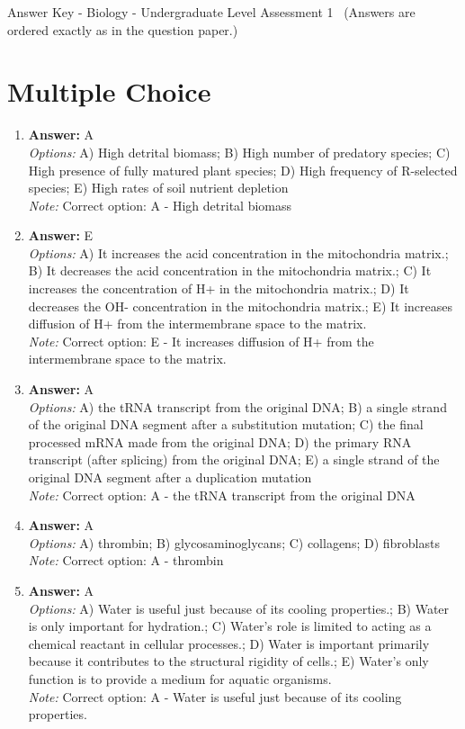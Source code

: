 \documentclass[12pt]{article}
\begin{document}
\begin{center}
Answer Key - Biology - Undergraduate Level Assessment 1 \
\small (Answers are ordered exactly as in the question paper.)
\end{center}

\section*{Multiple Choice}
\begin{enumerate}[label=\arabic*.]
\item \textbf{Answer:} A
\\ \textit{Options:} A) High detrital biomass; B) High number of predatory species; C) High presence of fully matured plant species; D) High frequency of R-selected species; E) High rates of soil nutrient depletion
\\ \textit{Note:} Correct option: A - High detrital biomass
\item \textbf{Answer:} E
\\ \textit{Options:} A) It increases the acid concentration in the mitochondria matrix.; B) It decreases the acid concentration in the mitochondria matrix.; C) It increases the concentration of H+ in the mitochondria matrix.; D) It decreases the OH- concentration in the mitochondria matrix.; E) It increases diffusion of H+ from the intermembrane space to the matrix.
\\ \textit{Note:} Correct option: E - It increases diffusion of H+ from the intermembrane space to the matrix.
\item \textbf{Answer:} A
\\ \textit{Options:} A) the tRNA transcript from the original DNA; B) a single strand of the original DNA segment after a substitution mutation; C) the final processed mRNA made from the original DNA; D) the primary RNA transcript (after splicing) from the original DNA; E) a single strand of the original DNA segment after a duplication mutation
\\ \textit{Note:} Correct option: A - the tRNA transcript from the original DNA
\item \textbf{Answer:} A
\\ \textit{Options:} A) thrombin; B) glycosaminoglycans; C) collagens; D) fibroblasts
\\ \textit{Note:} Correct option: A - thrombin
\item \textbf{Answer:} A
\\ \textit{Options:} A) Water is useful just because of its cooling properties.; B) Water is only important for hydration.; C) Water's role is limited to acting as a chemical reactant in cellular processes.; D) Water is important primarily because it contributes to the structural rigidity of cells.; E) Water's only function is to provide a medium for aquatic organisms.
\\ \textit{Note:} Correct option: A - Water is useful just because of its cooling properties.
\end{enumerate}
\end{document}
